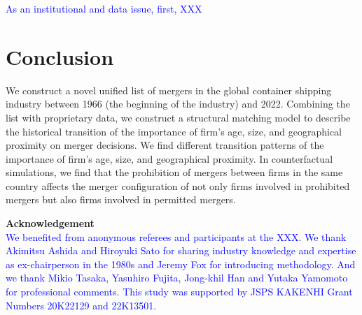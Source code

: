 \documentclass[10pt]{article}
\begin{document}
\textcolor{blue}{As an institutional and data issue, first, XXX}



\section{Conclusion}\label{sec:conclusion}
We construct a novel unified list of mergers in the global container shipping industry between 1966 (the beginning of the industry) and 2022. 
Combining the list with proprietary data, we construct a structural matching model to describe the historical transition of the importance of firm's age, size, and geographical proximity on merger decisions. 
We find different transition patterns of the importance of firm's age, size, and geographical proximity.
In counterfactual simulations, we find that the prohibition of mergers between firms in the same country affects the merger configuration of not only firms involved in prohibited mergers but also firms involved in permitted mergers.

\textbf{Acknowledgement} \\
\textcolor{blue}{We benefited from anonymous referees and participants at the XXX. We thank Akimitsu Ashida and Hiroyuki Sato for sharing industry knowledge and expertise as ex-chairperson in the 1980s and Jeremy Fox for introducing methodology. And we thank Mikio Tasaka, Yasuhiro Fujita, Jong-khil Han and Yutaka Yamomoto for professional comments. This study was supported by JSPS KAKENHI Grant Numbers 20K22129 and 22K13501. }





\end{document}
